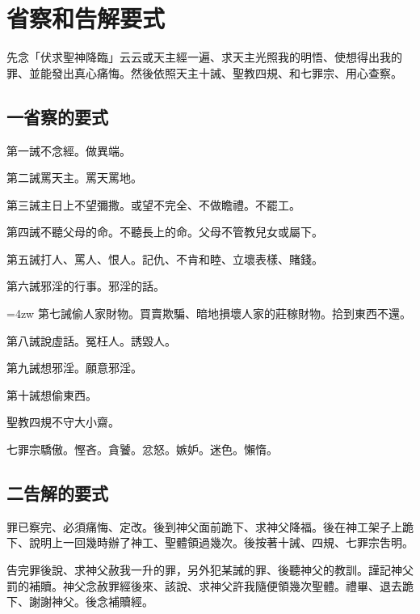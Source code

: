 \chapter[附錄 省察和告解要式]{省察和告解要式}
先念「伏求聖神降臨」云云或天主經一遍、求天主光照我的明悟、使想得出我的罪、並能發出真心痛悔。然後依照天主十誡、聖教四規、和七罪宗、用心查察。

\section*{一\quad 省察的要式}
第一誡\quad 不念經。做異端。

第二誡\quad 罵天主。罵天罵地。

第三誡\quad 主日上不望彌撒。或望不完全、不做瞻禮。不罷工。

第四誡\quad 不聽父母的命。不聽長上的命。父母不管教兒女或屬下。

第五誡\quad 打人、罵人、恨人。記仇、不肯和睦、立壞表樣、賭錢。

第六誡\quad 邪淫的行事。邪淫的話。

\hangindent=4zw 第七誡\quad 偷人家財物。買賣欺騙、暗地損壞人家的莊稼財物。拾到東西不還。

第八誡\quad 說虛話。冤枉人。誘毀人。

第九誡\quad 想邪淫。願意邪淫。

第十誡\quad 想偷東西。

聖教四規\quad 不守大小齋。

七罪宗\quad 驕傲。慳吝。貪饕。忿怒。嫉妒。迷色。懶惰。

\section*{二\quad 告解的要式}
罪已察完、必須痛悔、定改。後到神父面前跪下、求神父降福。{\cspace}後在神工架子上跪下、說明上一回幾時辦了神工、聖體領過幾次。後按著十誡、四規、七罪宗吿明。

告完罪後說、求神父赦我一升的罪，另外犯某誡的罪、後聽神父的教訓。謹記神父罰的補贖。{\cspace}神父念赦罪經後來、該說、求神父許我隨便領幾次聖體。禮畢、退去跪下、謝謝神父。後念補贖經。
